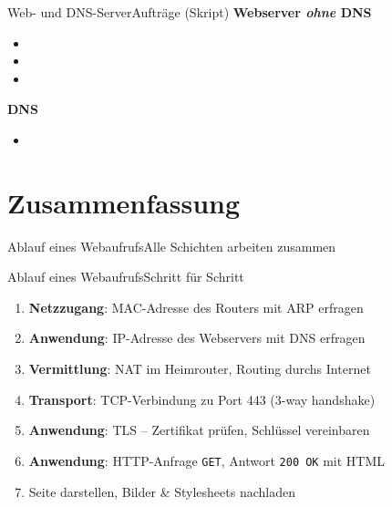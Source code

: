 \begin{frame}[fragile]{Web- und \acrshort{DNS}-Server}{Aufträge (Skript)}
    \textbf{Webserver \textit{ohne} \gls{DNS}}
    \begin{itemize}
        \item {}
        \item {}
        \item {}
    \end{itemize}
    \textbf{\gls{DNS}}
    \begin{itemize}
        \item {}
    \end{itemize}
\end{frame}

\section{Zusammenfassung}

\begin{frame}{Ablauf eines Webaufrufs}{Alle Schichten arbeiten zusammen}
    \begin{center}
    \end{center}
\end{frame}

\begin{frame}{Ablauf eines Webaufrufs}{Schritt für Schritt}
    \begin{enumerate}[<+->]\small
        \item \textcolor{\dataLinkLayerColor}{\textbf{Netzzugang}}: \acrshort{MAC}-Adresse des Routers mit \acrshort{ARP} erfragen
        \item \textcolor{\applicationLayerColor!80!black}{\textbf{Anwendung}}: \acrshort{IP}-Adresse des Webservers mit \acrshort{DNS} erfragen
        \item \textcolor{\networkLayerColor}{\textbf{Vermittlung}}: \acrshort{NAT} im Heimrouter, Routing durchs Internet
        \item \textcolor{\transportLayerColor}{\textbf{Transport}}: \acrshort{TCP}-Verbindung zu Port 443 (3-way handshake)
        \item \textcolor{\applicationLayerColor!80!black}{\textbf{Anwendung}}: \acrshort{TLS} -- Zertifikat prüfen, Schlüssel vereinbaren
        \item \textcolor{\applicationLayerColor!80!black}{\textbf{Anwendung}}: \acrshort{HTTP}-Anfrage \texttt{GET}, Antwort \texttt{200 OK} mit \acrshort{HTML}
        \item Seite darstellen, Bilder \& Stylesheets nachladen
    \end{enumerate}
\end{frame}

